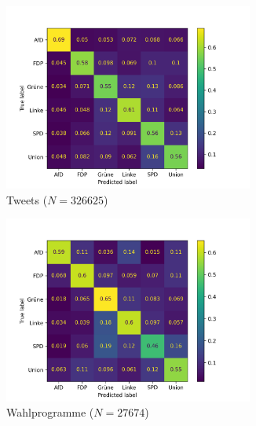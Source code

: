 \begin{figure}[H]
    \begin{subfigure}{0.5\textwidth}
      \centering
      \includegraphics[width=0.9\textwidth]{data/images/modeling/fasttext/none/tweets_confusion_matrix.png}
      \caption{Tweets (\(N = \num{326625}\))} \label{sfig:confusionMatrixFastTextTweetsUnbalanced}
    \end{subfigure}
    \hfill
    \begin{subfigure}{0.5\textwidth}
      \centering
      \includegraphics[width=0.9\textwidth]{data/images/modeling/fasttext/none/party_programs_confusion_matrix.png}
      \caption{Wahlprogramme (\(N = \num{27674}\))} \label{sfig:confusionMatrixFastTextManifestUnbalanced}
    \end{subfigure}
    \hfill
    \begin{subfigure}{0.5\textwidth}
      \centering

\end{subfigure}
\end{figure}
